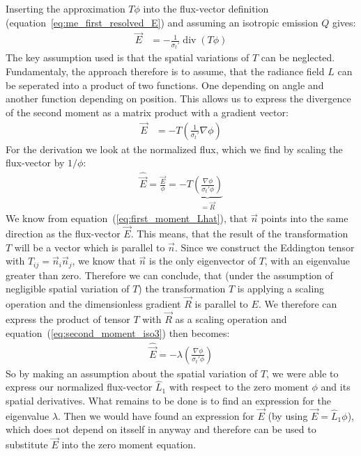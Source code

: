 Inserting the approximation $T\phi$ into the flux-vector definition (equation~\ref{eq:me_first_resolved_E}) and assuming an isotropic emission $Q$ gives:
\begin{align*}
\vec{E}&= -\frac{1}{\sigma_t'}\operatorname{div}\left (T\phi\right )
\end{align*}
The key assumption used is that the spatial variations of $T$ can be neglected. Fundamentaly, the approach therefore is to assume, that the radiance field $L$ can be seperated into a product of two functions. One depending on angle and another function depending on position. This allows us to express the divergence of the second moment as a matrix product with a gradient vector:
\begin{align}
\vec{E}&= -T\left(\frac{1}{\sigma_t'}\nabla\phi\right )
\label{eq:second_moment_iso2}
\end{align}
For the derivation we look at the normalized flux, which we find by scaling the flux-vector by $1/\phi$:
\begin{align}
\widehat{\vec{E}} = \frac{\vec{E}}{\phi}= -T\underbrace{\left(\frac{\nabla\phi}{\sigma_t'\phi}\right )}_{=\vec{R}}
\label{eq:second_moment_iso3}
\end{align}
We know from equation~(\ref{eq:first_moment_Lhat}), that $\vec{n}$ points into the same direction as the flux-vector $\vec{E}$. This means, that the result of the transformation $T$ will be a vector which is parallel to $\vec{n}$. Since we construct the Eddington tensor with $T_{ij}=\vec{n}_i\vec{n}_j$, we know that $\vec{n}$ is the only eigenvector of $T$, with an eigenvalue greater than zero. Therefore we can conclude, that (under the assumption of negligible spatial variation of $T$) the transformation $T$ is applying a scaling operation and the dimensionless gradient $\vec{R}$ is parallel to $E$. We therefore can express the product of tensor $T$ with $\vec{R}$ as a scaling operation and equation~(\ref{eq:second_moment_iso3}) then becomes:
\begin{align}
\widehat{\vec{E}} = -\lambda\left(\frac{\nabla\phi}{\sigma_t'\phi}\right )
\label{eq:second_moment_iso4}
\end{align}
So by making an assumption about the spatial variation of $T$, we were able to express our normalized flux-vector $\hat{L}_1$ with respect to the zero moment $\phi$ and its spatial derivatives. What remains to be done is to find an expression for the eigenvalue $\lambda$. Then we would have found an expression for $\vec{E}$ (by using $\vec{E}=\hat{L}_1\phi$), which does not depend on itsself in anyway and therefore can be used to substitute $\vec{E}$ into the zero moment equation.

